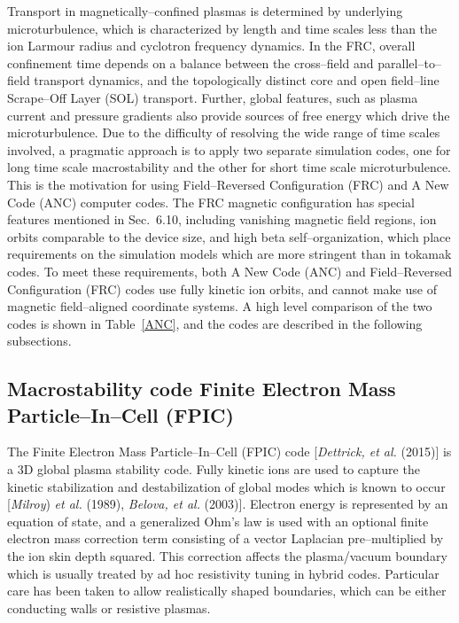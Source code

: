\documentclass[a4paper,openany,12pt]{book}
\begin{document}
Transport in magnetically--confined plasmas is determined by underlying microturbulence, which is characterized by length and time scales less than the ion Larmour radius and cyclotron frequency dynamics. In the FRC, overall confinement time depends on a balance between the cross--field and parallel--to--field transport dynamics, and the topologically distinct core and open field--line Scrape--Off Layer (SOL) transport. Further, global features, such as plasma current and pressure gradients also provide sources of free energy which drive the microturbulence. Due to the difficulty of resolving the wide range of time scales involved, a pragmatic approach is to apply two separate simulation codes, one for long time scale macrostability and the other for short time scale microturbulence. This is the motivation for using Field--Reversed Configuration (FRC) and A New Code (ANC) computer codes. The FRC magnetic configuration has special features mentioned in Sec.~6.10, including vanishing magnetic field regions, ion orbits comparable to the device size, and high beta self--organization, which place requirements on the simulation models which are more stringent than in tokamak codes. To meet these requirements, both A New Code (ANC) and Field--Reversed Configuration (FRC) codes use fully kinetic ion orbits, and cannot make use of magnetic field--aligned coordinate systems. A high level comparison of the two codes is shown in Table~\ref{ANC}, and the codes are described in the following subsections.

\subsection{Macrostability code Finite Electron Mass Particle--In--Cell (FPIC)}

The Finite Electron Mass Particle--In--Cell (FPIC) code [\emph{Dettrick, et al.} (2015)] is a 3D global plasma stability code. Fully kinetic ions are used to capture the kinetic stabilization and destabilization of global modes which is known to occur [\emph{Milroy}) \emph{et al.} (1989), \emph{Belova, et al.} (2003)]. Electron energy is represented by an equation of state, and a generalized Ohm's law is used with an optional finite electron mass correction term consisting of a vector Laplacian pre--multiplied by the ion skin depth squared. This correction affects the  plasma/vacuum boundary which is usually treated by ad hoc resistivity tuning in hybrid codes. Particular care has been taken to allow realistically shaped boundaries, which can be either conducting walls or resistive plasmas.
\end{document}
